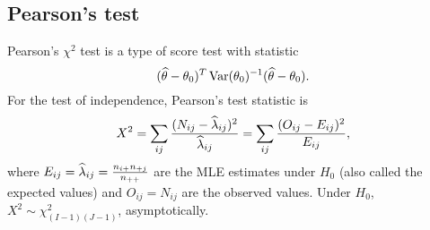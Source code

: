 \subsection{Pearson's test}
Pearson's $\chi^2$ test is a type of score test with statistic 
\[(\widehat{{\theta}}-{\theta}_0)^T \operatorname{Var}({\theta}_0)^{-1}(\widehat{{\theta}}-{\theta}_0). \]
For the test of independence, Pearson's test statistic is 
\begin{align*}
    X^2 = \sum_{ij}\frac{(N_{ij}-\widehat{\lambda}_{ij})^2}{\widehat{\lambda}_{ij}} = \sum_{ij} \frac{(O_{ij}-E_{ij})^2}{E_{ij}},
\end{align*}
where $E_{ij}=\widehat{\lambda}_{ij} = \frac{n_{i+}n_{+j}}{n_{++}}$ are the MLE estimates under $H_0$ (also called the expected values) and $O_{ij}=N_{ij}$ are the observed values. Under $H_0$, $X^2 \sim \chi^2_{(I-1)(J-1)}$, asymptotically. 
